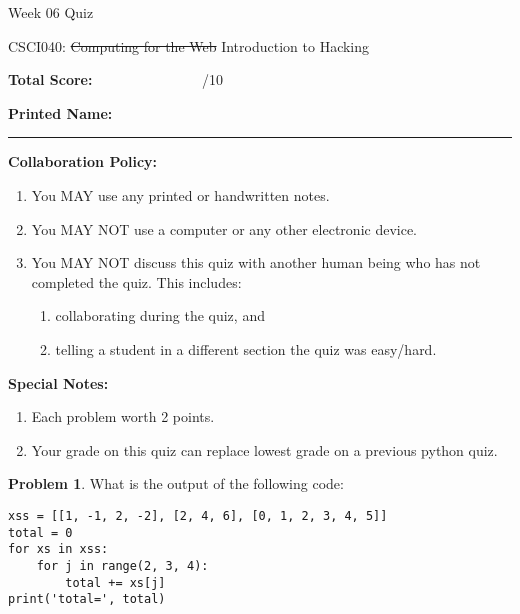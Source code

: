 \documentclass[10pt]{article}
\theoremstyle{definition}
\newtheorem{problem}{Problem}
\begin{document}
\begin{center}
    {
\Large
    Week 06 Quiz
}

    \vspace{0.1in}
    CSCI040: \sout{Computing for the Web} Introduction to Hacking

    \vspace{0.1in}
\end{center}


\vspace{0.15in}
\noindent
\textbf{Total Score:} ~~~~~~~~~~~~~~~/10

\vspace{0.5in}
\noindent
\textbf{Printed Name:}

\noindent
\rule{\textwidth}{0.1pt}
\vspace{0.25in}

\noindent
\textbf{Collaboration Policy:}
\begin{enumerate}
    \item You MAY use any printed or handwritten notes.
    \item You MAY NOT use a computer or any other electronic device.
    \item You MAY NOT discuss this quiz with another human being who has not completed the quiz.
        This includes:
        \begin{enumerate}
            \item collaborating during the quiz, and
            \item telling a student in a different section the quiz was easy/hard.
        \end{enumerate}
\end{enumerate}

\noindent
\textbf{Special Notes:}
\begin{enumerate}
    \item Each problem worth 2 points.
    \item Your grade on this quiz can replace lowest grade on a previous python quiz.
\end{enumerate}

\vspace{0.15in}

\begin{problem}
    What is the output of the following code:
\end{problem}
\begin{lstlisting}
xss = [[1, -1, 2, -2], [2, 4, 6], [0, 1, 2, 3, 4, 5]]
total = 0
for xs in xss:
    for j in range(2, 3, 4):
        total += xs[j]
print('total=', total)
\end{lstlisting}
\vspace{1in}
\end{document}
